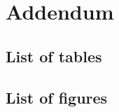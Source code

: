\chapter{Addendum}

\begingroup
  \renewcommand{\chapter}[2]{}
  \section{List of tables}
  \listoftables

  \section{List of figures}
  \listoffigures
\endgroup
